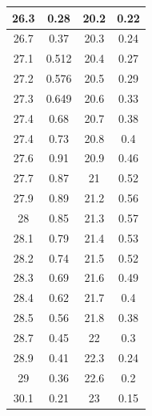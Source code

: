 \documentclass[a4paper]{article}
\begin{document}
\begin{table}[H]
\begin{tabular}{|c|c|c|c|}
        26.3                        & 0.28                       & 20.2     & 0.22   \\ \hline
        26.7                        & 0.37                       & 20.3     & 0.24   \\ \hline
        27.1                        & 0.512                      & 20.4     & 0.27   \\ \hline
        27.2                        & 0.576                      & 20.5     & 0.29   \\ \hline
        27.3                        & 0.649                      & 20.6     & 0.33   \\ \hline
        27.4                        & 0.68                       & 20.7     & 0.38   \\ \hline
        27.4                        & 0.73                       & 20.8     & 0.4    \\ \hline
        27.6                        & 0.91                       & 20.9     & 0.46   \\ \hline
        27.7                        & 0.87                       & 21       & 0.52   \\ \hline
        27.9                        & 0.89                       & 21.2     & 0.56   \\ \hline
        28                          & 0.85                       & 21.3     & 0.57   \\ \hline
        28.1                        & 0.79                       & 21.4     & 0.53   \\ \hline
        28.2                        & 0.74                       & 21.5     & 0.52   \\ \hline
        28.3                        & 0.69                       & 21.6     & 0.49   \\ \hline
        28.4                        & 0.62                       & 21.7     & 0.4    \\ \hline
        28.5                        & 0.56                       & 21.8     & 0.38   \\ \hline
        28.7                        & 0.45                       & 22       & 0.3    \\ \hline
        28.9                        & 0.41                       & 22.3     & 0.24   \\ \hline
        29                          & 0.36                       & 22.6     & 0.2    \\ \hline
        30.1                        & 0.21                       & 23       & 0.15   \\ \hline

\end{tabular}
\end{table}
\end{document}

